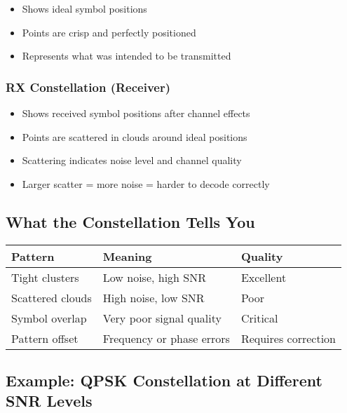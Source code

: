 \begin{itemize}
\tightlist
\item
  Shows ideal symbol positions
\item
  Points are crisp and perfectly positioned
\item
  Represents what was intended to be transmitted
\end{itemize}

\subsubsection{RX Constellation
(Receiver)}\label{rx-constellation-receiver}

\begin{itemize}
\tightlist
\item
  Shows received symbol positions after channel effects
\item
  Points are scattered in clouds around ideal positions
\item
  Scattering indicates noise level and channel quality
\item
  Larger scatter = more noise = harder to decode correctly
\end{itemize}

\subsection{What the Constellation Tells
You}\label{what-the-constellation-tells-you}

{\def\LTcaptype{} %
\begin{longtable}[]{@{}lll@{}}
\toprule\noalign{}
Pattern & Meaning & Quality \\
\midrule\noalign{}
\endhead
\bottomrule\noalign{}
\endlastfoot
Tight clusters & Low noise, high SNR & Excellent \\
Scattered clouds & High noise, low SNR & Poor \\
Symbol overlap & Very poor signal quality & Critical \\
Pattern offset & Frequency or phase errors & Requires correction \\
\end{longtable}
}

\subsection{Example: QPSK Constellation at Different SNR
Levels}\label{example-qpsk-constellation-at-different-snr-levels}

